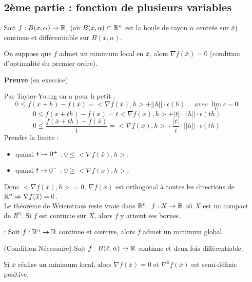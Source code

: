 		\subsection{2ème partie : fonction de plusieurs variables}
		
		\begin{theoreme}		
		Soit $f : B(\bar{x}, \alpha) \rightarrow \mathbb{R}$,  (où $B(\bar{x}, \alpha) \subset \mathbb{R}^n$ est la boule de rayon $\alpha$ centrée sur $\bar{x}$) continue et différentiable sur $B(\bar{x}, \alpha)$.
		
		On suppose que $f$ admet un minimum local en $\bar{x}$, alors $\nabla f(\bar{x}) = 0$ (condition d'optimalité du premier ordre).
		\end{theoreme}
		
		\textbf{Preuve} (en exercice)
		
		Par Taylor-Young on a pour h petit : 
		\[ 0 \leq f(\bar{x}+h)-f(\bar{x}) = < \nabla f(\bar{x}) ,h> + ||h||\cdot \epsilon(h) \quad \textit{ avec } \lim_0 \epsilon = 0\]
		\[ 0 \leq f(\bar{x}+th)-f(\bar{x}) = t< \nabla f(\bar{x}) ,h> + |t|\cdot ||h||\cdot \epsilon(th) \]
		\[ 0 \leq \frac{ f(\bar{x}+th)-f(\bar{x}) }{t} = < \nabla f(\bar{x}) ,h> + \frac{|t|}{t}\cdot ||h||\cdot \epsilon(th) \]
		Prendre la limite :
		\begin{itemize}
		\item quand $t\rightarrow 0^+$ : $0\leq <\nabla f(\bar{x}),h>$,
		\item quand $t\rightarrow 0^-$ : $0\geq <\nabla f(\bar{x}),h>$,
		\end{itemize}
		Donc $<\nabla f(\bar{x}),h>=0$, $\nabla f(\bar{x})$ est orthogonal à toutes les directions de $\mathbb{R}^n\Rightarrow \nabla f(\bar{x})=0 $.\\
		
		Le théorème de Weierstrass reste vraie dans $\mathbb{R}^n$.
		$f:X\rightarrow \mathbb{R}$ où $X$ est un compact de $R^n$.
		Si $f$ est continue sur $X$, alors $f$ y atteint ses bornes.
		
		\begin{theoreme} : 
		Soit $f: \mathbb{R}^n \rightarrow \mathbb{R}$ continue et c\oe rcive, alors $f$ admet un minimum global.
		\end{theoreme}
		
		\begin{theoreme} (Condition Nécessaire)
		Soit $f : B(\bar{x}, \alpha) \rightarrow \mathbb{R}$ continue et deux fois différentiable.
		
		Si $\bar{x}$ réalise un minimum local, alors $\nabla f(\bar{x}) = 0$ et $\nabla^2 f(\bar{x})$ est semi-définie positive.
		\end{theoreme}
		
